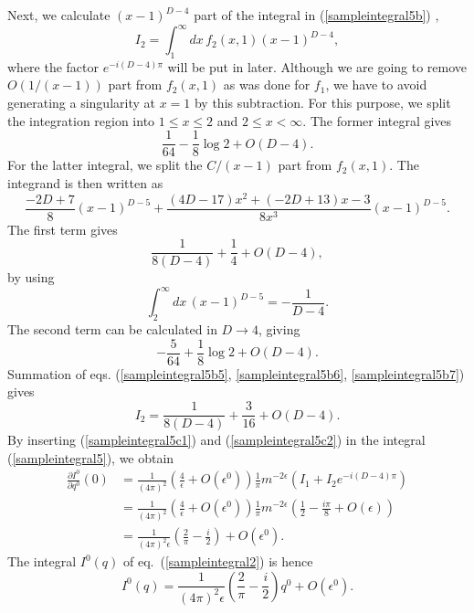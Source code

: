 \documentclass[preprint,amsmath,amssymb,superscriptaddress, floatfix,nofootinbib]{revtex4}
\begin{document}
Next, we calculate $(x-1)^{D-4}$ part of the integral in  (\ref{sampleintegral5b}) ,
\begin{equation}
I_2 = \int_1^{\infty} dx \, f_2(x,1)(x-1)^{D-4} , 
\end{equation}
where the factor $e^{-i(D-4)\pi}$ will be put in later. 
Although we are going to remove $O(1/(x-1))$ part from 
$f_2(x,1)$ as was done for $f_1$, we have to avoid generating a singularity at $x=1$ 
by this subtraction. For this purpose, we split the integration region into $1\le x \le 2$ and 
$2\le x<\infty$. The former integral gives 
\begin{equation}
\frac{1}{64} - \frac{1}{8}\log 2 +O(D-4). 
\label{sampleintegral5b5} 
\end{equation}
For  the latter integral, we split the $C/(x-1)$ part from $f_2(x,1)$. 
The integrand is then written as 
\begin{equation}
\frac{-2D+7}{8}(x-1)^{D-5} + \frac{(4D-17)x^2+(-2D+13)x-3}{8x^3}(x-1)^{D-5} .
\end{equation}
The first term gives 
\begin{equation}
\frac{1}{8(D-4)}+ \frac{1}{4} + O(D-4) , 
\label{sampleintegral5b6}
\end{equation}
by using
\begin{equation}
\int_2^{\infty} dx \, (x-1)^{D-5} = -\frac{1}{D-4} .
\end{equation}
The second term can be calculated in $D\to 4$, giving 
\begin{equation}
-\frac{5}{64}+\frac{1}{8}\log 2 +O(D-4) . 
\label{sampleintegral5b7}
\end{equation}
Summation of eqs. (\ref{sampleintegral5b5}, \ref{sampleintegral5b6}, 
\ref{sampleintegral5b7}) gives 
\begin{equation}
I_2 = \frac{1}{8(D-4)} +\frac{3}{16} + O(D-4) . 
\label{sampleintegral5c2}
\end{equation}
By inserting (\ref{sampleintegral5c1}) and 
(\ref{sampleintegral5c2}) in the integral 
(\ref{sampleintegral5}), we obtain 
%
\begin{align}
\frac{\partial I^0}{\partial q^0}(0) & = 
\frac{1}{(4\pi)^2}\left( \frac{4}{\epsilon}+O(\epsilon^0) \right) \frac{1}{\pi} m^{-2\epsilon} 
( I_1 + I_2 e^{-i(D-4)\pi}  ) 
\nonumber \\ 
&= 
\frac{1}{(4\pi)^2}\left( \frac{4}{\epsilon}+O(\epsilon^0) \right) \frac{1}{\pi} m^{-2\epsilon} 
\left( \frac{1}{2} - \frac{i\pi}{8}+ O(\epsilon)  \right) 
\nonumber \\
&= \frac{1}{(4\pi)^2\epsilon}\left( \frac{2}{\pi}- \frac{i}{2} \right)+O(\epsilon^0) .
\label{sampleintegral6}
\end{align}
%
The integral $I^0(q)$ of eq.~(\ref{sampleintegral2}) is hence 
\begin{equation}
 I^0(q) = \frac{1}{(4\pi)^2\epsilon}
 \left( \frac{2}{\pi}- \frac{i}{2} 
 \right) q^0 +O(\epsilon^0) .
\end{equation}
\end{document}
